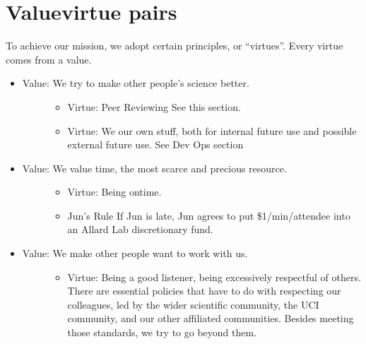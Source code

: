 \documentclass[letterpaper,10pt,english]{sphinxmanual}
\begin{document}
\section{Value\sphinxhyphen{}virtue pairs}
\label{\detokenize{01OurMission:value-virtue-pairs}}
\sphinxAtStartPar
To achieve our mission, we adopt certain principles, or “virtues”. Every virtue comes from a value.
\begin{itemize}
\item {} \begin{description}
\item[{Value: We try to make other people’s science better.}] \leavevmode\begin{itemize}
\item {} 
\sphinxAtStartPar
Virtue: Peer Reviewing See this {\hyperref[\detokenize{PeerReviewing:peer-reviewing}]{}} section.

\item {} 
\sphinxAtStartPar
Virtue: We  our own stuff, both for internal future use and possible external future use. See Dev Ops section

\end{itemize}

\end{description}

\item {} \begin{description}
\item[{Value: We value time, the most scarce and precious resource.}] \leavevmode\begin{itemize}
\item {} 
\sphinxAtStartPar
Virtue: Being on\sphinxhyphen{}time.

\item {} 
\sphinxAtStartPar
Jun’s Rule If Jun is late, Jun agrees to put \$1/min/attendee into an Allard Lab discretionary fund.

\end{itemize}

\end{description}

\item {} \begin{description}
\item[{Value: We make other people want to work with us.}] \leavevmode\begin{itemize}
\item {} 
\sphinxAtStartPar
Virtue: Being a good listener, being excessively respectful of others. There are essential policies that have to do with respecting our colleagues, led by the wider scientific community, the UCI community, and our other affiliated communities. Besides meeting those standards, we try to go beyond them.


\end{itemize}
\end{description}
\end{itemize}
\end{document}
